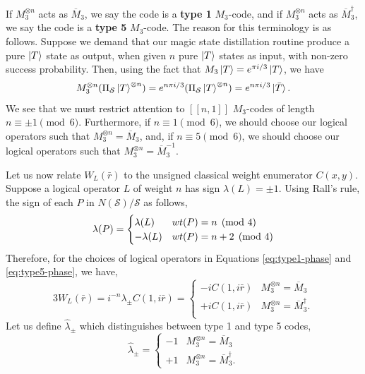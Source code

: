 \documentclass[11pt]{article}
\def\ket#1{\mathinner{|{#1}\rangle}}
\newcommand{\wt}{{\rm{wt}} }
\begin{document}
If $M_3^{\otimes n}$ acts as $\overline{M}_3$, we say the code is a \textbf{type 1} $M_3$-code, and if $M_3^{\otimes n}$ acts as $\overline{M}_3^\dagger$, we say the code is a \textbf{type 5} $M_3$-code. The reason for this terminology is as follows. Suppose we demand that our magic state distillation routine produce a pure $\ket{T}$ state as output, when given $n$ pure $\ket{T}$ states as input, with non-zero success probability. Then, using the fact that $M_3\ket{T}=e^{\pi i/3} \ket{T}$, we have \begin{eqnarray}
   M_3^{\otimes n} (\Pi_{\mathcal S} \ket{T}^{\otimes n}) = e^{n\pi i/3}  (\Pi_{\mathcal S} \ket{T}^{\otimes n}) = e^{n\pi i/3} \ket{\bar{T}}.  
\end{eqnarray}
We see that we must restrict attention to $[[n,1]]$ $M_3$-codes of length $n \equiv \pm 1 \pmod 6$. Furthermore, if $n \equiv 1 \pmod 6$, we should choose our logical operators such that $M_3^{\otimes n} = \overline{M}_3$, and, if $n \equiv 5 \pmod 6$, we should choose our logical operators such that $M_3^{\otimes n} = \overline{M}_3^{-1}$.  


Let us now relate $W_L(\bar{r})$ to the unsigned classical weight enumerator $C(x,y)$. Suppose a logical operator $L$ of weight $n$ has sign $\lambda(L)=\pm 1$. Using Rall's rule, the sign of each $P$ in $N(\mathcal S)/\mathcal S$ as follows, 
\begin{equation}
    \lambda(P) = \begin{cases}
    \lambda(L) & \wt(P) =n \pmod 4 \\
    -\lambda(L) & \wt(P) = n+2 \pmod 4
    \end{cases}
\end{equation}
Therefore, for the choices of logical operators in Equations \eqref{eq:type1-phase} and \eqref{eq:type5-phase}, we have, 
\begin{equation}
    3 W_L(\bar{r}) =i^{-n} \lambda_\pm  C(1,i \bar{r})= 
    \begin{cases}
        -i C(1,i \bar{r})   & M_3^{\otimes n} = \overline{M}_3 \\
        +i C(1,i \bar{r}) & M_3^{\otimes n} = \overline{M}_3^\dagger. \\
    \end{cases}
\end{equation} 
Let us define $\hat{\lambda}_\pm$ which distinguishes between type 1 and type 5 codes,
\begin{equation}
    \hat{\lambda}_\pm = \begin{cases}
        -1 & M_3^{\otimes n} = \overline{M}_3 \\ 
        +1 & M_3^{\otimes n} = \overline{M}_3^\dagger.
    \end{cases}
\end{equation}
 
\end{document}
